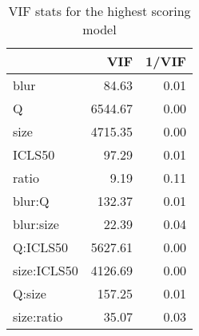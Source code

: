 \documentclass[12pt]{article}
\begin{document}


\begin{table}[ht]
	\centering
	\caption{VIF stats for the highest scoring model}
	\begin{tabular}{lrr}
	  \toprule
	 & VIF & 1/VIF \\ 
	  \midrule
	blur & 84.63 & 0.01 \\ 
	  Q & 6544.67 & 0.00 \\ 
	  size & 4715.35 & 0.00 \\ 
	  ICLS50 & 97.29 & 0.01 \\ 
	  ratio & 9.19 & 0.11 \\ 
	  blur:Q & 132.37 & 0.01 \\ 
	  blur:size & 22.39 & 0.04 \\ 
	  Q:ICLS50 & 5627.61 & 0.00 \\ 
	  size:ICLS50 & 4126.69 & 0.00 \\ 
	  Q:size & 157.25 & 0.01 \\ 
	  size:ratio & 35.07 & 0.03 \\ 
	   \bottomrule
	\end{tabular}
	\label{tab:vif}
\end{table}
\end{document}
